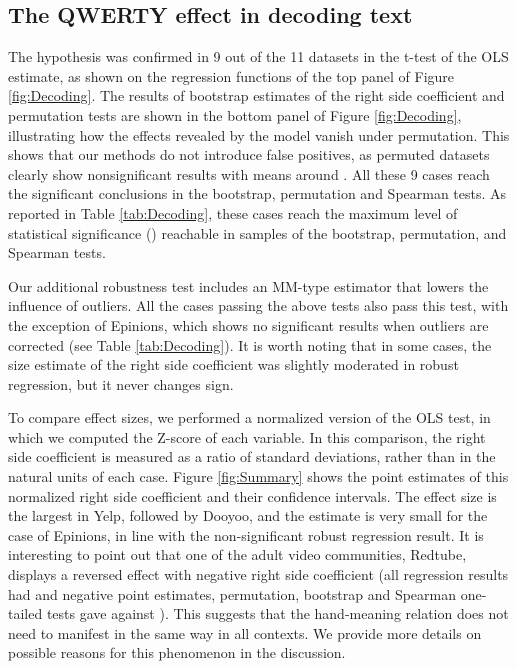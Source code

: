 \documentclass[letterpaper]{sig-alternate-2013}
\begin{document}
\subsection{The QWERTY effect in decoding text}

The hypothesis  was confirmed in 9 out of the 11 datasets in the t-test
of the OLS estimate, as shown on the regression functions of the top panel of
Figure \ref{fig:Decoding}. The results of bootstrap estimates of the right
side coefficient and permutation tests are shown in the bottom panel of Figure
\ref{fig:Decoding}, illustrating how the effects revealed by the model vanish
under permutation. This shows that our methods do not introduce false
positives, as permuted datasets clearly show nonsignificant results with means
around . All these 9 cases reach the significant conclusions in the
bootstrap, permutation and Spearman tests. As reported in Table
\ref{tab:Decoding}, these cases reach the maximum level of statistical
significance () reachable in  samples of the bootstrap,
permutation, and Spearman tests.

Our additional robustness test includes an MM-type estimator that lowers the
influence of outliers.  All the cases passing the above tests also pass this
test, with the exception of Epinions, which shows no significant results when
outliers are corrected (see Table \ref{tab:Decoding}). It is worth noting that
in some cases, the size estimate of the right side coefficient   was
slightly moderated in robust regression, but it never changes sign.

To compare effect sizes, we performed a normalized version of the OLS test, in
which we computed the Z-score of each variable. In this comparison, the right
side coefficient  is measured as a ratio of standard deviations, rather than
in the natural units of each case. Figure \ref{fig:Summary} shows the point
estimates of this normalized right side coefficient   and their
 confidence intervals. The effect size is the largest in Yelp, followed
by Dooyoo, and the estimate is very small for the case of Epinions, in line
with the non-significant robust regression result. It is interesting to point out
that one of the adult video communities, Redtube, displays a reversed effect
with negative right side coefficient (all regression results had  and
negative point estimates, permutation, bootstrap and Spearman one-tailed
tests gave  against ). This suggests that the hand-meaning relation
does not need to manifest in the same way in all contexts. We provide more
details on possible reasons for this phenomenon in the discussion.
\end{document}
